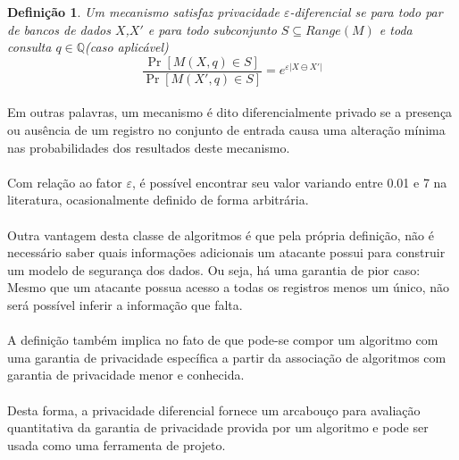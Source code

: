 \newtheorem{definition}{Definição}
\begin{definition}\cite{dwork2011differential}
     Um mecanismo satisfaz privacidade $\varepsilon$-diferencial se para todo par de bancos de dados $X$,$X'$ e para todo subconjunto $S \subseteq Range(M)$ e toda consulta $q \in \mathbb{Q}$(caso aplicável)
     \[ \frac{\Pr \left[M\left(X,q\right)  \in  S \right]}{\Pr \left[M\left(X',q\right)  \in  S \right]} = e^{\varepsilon\vert X \ominus X' \vert }\]
\end{definition}

\paragraph{} Em outras palavras, um mecanismo é dito diferencialmente privado se a presença ou ausência de um registro no conjunto de entrada causa uma alteração mínima nas probabilidades dos resultados deste mecanismo.

\paragraph{} Com relação ao fator $\varepsilon$, é possível encontrar seu valor variando entre 0.01 e 7 na literatura, ocasionalmente definido de forma arbitrária\cite{hsu2014differential}.

\paragraph{} Outra vantagem desta classe de algoritmos é que pela própria definição, não é necessário saber quais informações adicionais um atacante possui para construir um modelo de segurança dos dados. Ou seja, há uma garantia de pior caso: Mesmo que um atacante possua acesso a todas os registros menos um único, não será possível inferir a informação que falta.

\paragraph{} A definição também implica no fato de que pode-se compor um algoritmo com uma garantia de privacidade específica a partir da associação de algoritmos com garantia de privacidade menor e conhecida\cite{cummings2018differential}.

\paragraph{} Desta forma, a privacidade diferencial fornece um arcabouço para avaliação quantitativa da garantia de privacidade provida por um algoritmo e pode ser usada como uma ferramenta de projeto.



